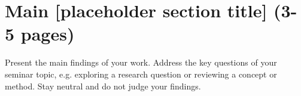 \chapter{Main [placeholder section title] (3-5 pages)}
\label{ch:main}
Present the main findings of your work. Address the key questions of your seminar topic, e.g. exploring a research question or reviewing a concept or method.  
Stay neutral and do not judge your findings.